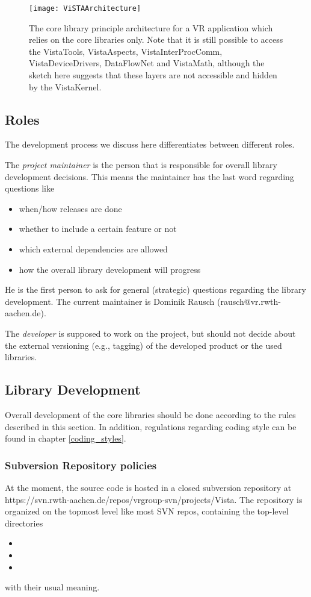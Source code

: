 \begin{figure}
\begin{center}
\texttt{[image: ViSTAArchitecture]}
\end{center}
\caption{\label{fig:ViSTAArchitecture}
  The  core library principle architecture for a VR application which relies on the  core libraries only.
  Note that it is still possible to access the VistaTools, VistaAspects, VistaInterProcComm, VistaDeviceDrivers, DataFlowNet and VistaMath, although the sketch here suggests that these layers are not accessible and hidden by the VistaKernel.}
\end{figure}
 
\subsection{Roles}
The development process we discuss here differentiates between different roles.

The \textit{project maintainer} is the person that is responsible for overall library development decisions.
This means the maintainer has the last word regarding questions like
\begin{itemize}
\item when/how releases are done
\item whether to include a certain feature or not
\item which external dependencies are allowed
\item how the overall library development will progress
\end{itemize}
He is the first person to ask for general (strategic) questions regarding the library development.
The current  maintainer is Dominik Rausch (rausch@vr.rwth-aachen.de).

The \textit{developer} is supposed to work on the project, but should not decide about the external versioning (e.g., tagging) of the developed product or the used libraries.

\subsection{Library Development}
Overall development of the  core libraries should be done according to the rules described in this section.
In addition, regulations regarding coding style can be found in chapter \ref{coding_styles}.

\subsubsection{Subversion Repository policies}
At the moment, the  source code is hosted in a closed subversion repository  at https://svn.rwth-aachen.de/repos/vrgroup-svn/projects/Vista.
The repository is organized on the topmost level like most SVN repos, containing the top-level directories
\begin{itemize}
\item{}
\item{}
\item{}
\end{itemize}
with their usual meaning.


